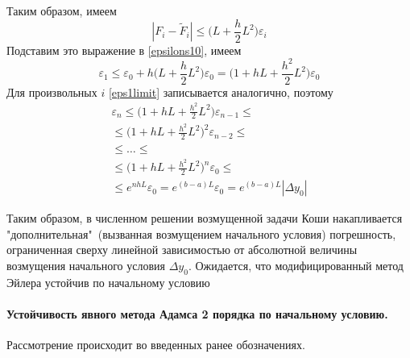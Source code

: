 \documentclass[a4paper, 12pt]{article}
\theoremstyle{mythm}
\begin{document}
	Таким образом, имеем
	\begin{equation}
		|F_i-\widetilde{F}_i| \leq \bigg(L + \frac{h}{2}L^2\bigg)\varepsilon_i
	\end{equation}
	Подставим это выражение в \eqref{epsilons10}, имеем
	\begin{equation} \label{eps1limit}
		\varepsilon_1 \leq \varepsilon_0 + h\bigg(L+\frac{h}{2}L^2\bigg)\varepsilon_0=\bigg(1 + hL + \frac{h^2}{2}L^2\bigg)\varepsilon_0
	\end{equation}
	Для произвольных $i$ \eqref{eps1limit} записывается аналогично, поэтому
	\begin{equation}
		\begin{gathered}
			\varepsilon_n \leq \bigg(1 + hL + \frac{h^2}{2}L^2\bigg)\varepsilon_{n-1} \leq \\ \leq \bigg(1 + hL + \frac{h^2}{2}L^2\bigg)^2\varepsilon_{n-2} \leq \\ \leq \dots \leq \\ \leq  \bigg(1 + hL + \frac{h^2}{2}L^2\bigg)^n\varepsilon_{0} \leq \\ \leq e^{nhL}\varepsilon_{0} = e^{(b-a)L}\varepsilon_{0}=e^{(b-a)L}|\Delta y_0|
		\end{gathered}
	\end{equation}

	Таким образом, в численном решении возмущенной задачи Коши накапливается "дополнительная"\ (вызванная возмущением начального условия) погрешность, ограниченная сверху линейной зависимостью от абсолютной величины возмущения начального условия $\Delta y_0$. Ожидается, что модифицированный метод Эйлера устойчив по начальному условию
	
	\paragraph{Устойчивость явного метода Адамса 2 порядка по начальному условию.}
	
	Рассмотрение происходит во введенных ранее обозначениях. 
	
\end{document}
